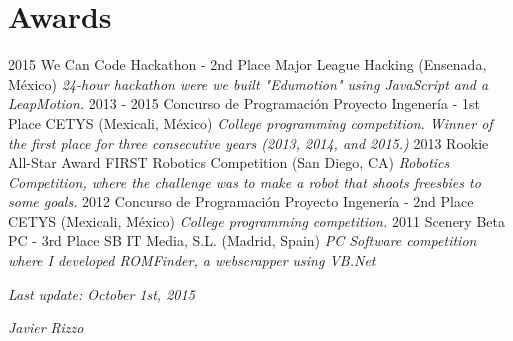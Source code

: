 \documentclass[]{friggeri-cv}
\begin{document}
\section{Awards}
  \entry
    {2015}
    {We Can Code Hackathon - 2nd Place}
    {Major League Hacking (Ensenada, México)}
    {\emph{24-hour hackathon were we built "Edumotion" using JavaScript and a LeapMotion.}}
  \entry
    {2013 - 2015}
    {Concurso de Programación Proyecto Ingenería - 1st Place}
    {CETYS (Mexicali, México)}
    {\emph{College programming competition. Winner of the first place for three consecutive years (2013, 2014, and 2015.)}}
  \entry
    {2013}
    {Rookie All-Star Award}
    {FIRST Robotics Competition (San Diego, CA)}
    {\emph{Robotics Competition, where the challenge was to make a robot that shoots freesbies to some goals.}}
  \entry
    {2012}
    {Concurso de Programación Proyecto Ingenería - 2nd Place}
    {CETYS (Mexicali, México)}
    {\emph{College programming competition.}}
  \entry
    {2011}
    {Scenery Beta PC - 3rd Place}
    {SB IT Media, S.L. (Madrid, Spain)}
    {\emph{PC Software competition where I developed ROMFinder, a webscrapper using VB.Net}}
\\
\begin{flushleft}
\emph{Last update: October 1st, 2015}
\end{flushleft}
\begin{flushright}
\emph{Javier Rizzo}
\end{flushright}
\end{document}
